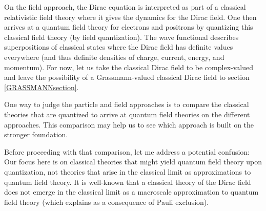 \documentclass[onecolumn,secnumarabic,amsmath,amssymb,balancelastpage,nofootinbib,12pt]{article}
\begin{document}
On the field approach, the Dirac equation is interpreted as part of a classical relativistic field theory where it gives the dynamics for the Dirac field.  One then arrives at a quantum field theory for electrons and positrons by quantizing this classical field theory (by field quantization).  The wave functional describes superpositions of classical states where the Dirac field has definite values everywhere (and thus definite densities of charge, current, energy, and momentum).  For now, let us take the classical Dirac field to be complex-valued and leave the possibility of a Grassmann-valued classical Dirac field to section \ref{GRASSMANNsection}.


One way to judge the particle and field approaches is to compare the classical theories that are quantized to arrive at quantum field theories on the different approaches.  This comparison may help us to see which approach is built on the stronger foundation.

Before proceeding with that comparison, let me address a potential confusion: Our focus here is on classical theories that might yield quantum field theory upon quantization, not theories that arise in the classical limit as approximations to quantum field theory.  It is well-known that a classical theory of the Dirac field does not emerge in the classical limit as a macroscale approximation to quantum field theory (which \citealp[pg.\ 221]{duncan} explains as a consequence of Pauli exclusion).
\end{document}
